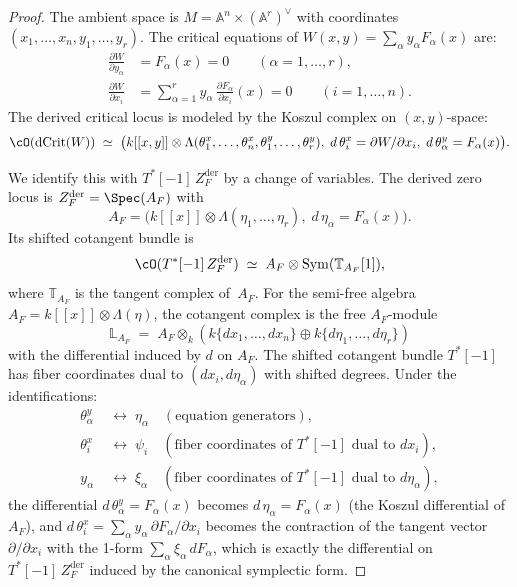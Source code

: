 \begin{proof}
The ambient space is $M = \mathbb{A}^n \times (\mathbb{A}^r)^\vee$ with
coordinates $(x_1, \ldots, x_n, y_1, \ldots, y_r)$.
The critical equations of $W(x,y) = \sum_\alpha y_\alpha F_\alpha(x)$
are:
\begin{align}
\frac{\partial W}{\partial y_\alpha}
&= F_\alpha(x) = 0
\qquad (\alpha = 1, \ldots, r),
\label{eq:dcrit-y-eq} \\
\frac{\partial W}{\partial x_i}
&= \sum_{\alpha=1}^{r} y_\alpha\,
\frac{\partial F_\alpha}{\partial x_i}(x) = 0
\qquad (i = 1, \ldots, n).
\label{eq:dcrit-x-eq}
\end{align}
The derived critical locus is modeled by the Koszul complex on
$(x, y)$-space:
\[
\cO(\operatorname{dCrit}(W))
\;\simeq\;
\bigl(k[[x, y]] \otimes \Lambda(\theta_1^x, \ldots, \theta_n^x,
\theta_1^y, \ldots, \theta_r^y),\;
d\,\theta_i^x = \partial W / \partial x_i,\;
d\,\theta_\alpha^y = F_\alpha(x)\bigr).
\]

We identify this with $T^*[-1]\, Z_F^{\mathrm{der}}$ by a change
of variables. The derived zero locus is
$Z_F^{\mathrm{der}} = \Spec(A_F)$ with
\[
A_F = \bigl(k[[x]] \otimes \Lambda(\eta_1, \ldots, \eta_r),\;
d\,\eta_\alpha = F_\alpha(x)\bigr).
\]
Its shifted cotangent bundle is
\[
\cO(T^*[-1]\, Z_F^{\mathrm{der}})
\;\simeq\;
A_F \otimes \mathrm{Sym}(\mathbb{T}_{A_F}[1]),
\]
where $\mathbb{T}_{A_F}$ is the tangent complex of~$A_F$.
For the semi-free algebra $A_F = k[[x]] \otimes \Lambda(\eta)$,
the cotangent complex is the free $A_F$-module
\[
\mathbb{L}_{A_F}
\;=\; A_F \otimes_k (k\{dx_1, \ldots, dx_n\}
\oplus k\{d\eta_1, \ldots, d\eta_r\})
\]
with the differential induced by $d$ on $A_F$. The shifted
cotangent bundle $T^*[-1]$ has fiber coordinates dual to
$(dx_i, d\eta_\alpha)$ with shifted degrees. Under the
identifications:
\begin{align*}
\theta_\alpha^y &\;\longleftrightarrow\; \eta_\alpha
\quad (\text{equation generators}), \\
\theta_i^x &\;\longleftrightarrow\; \psi_i
\quad (\text{fiber coordinates of } T^*[-1]
\text{ dual to } dx_i), \\
y_\alpha &\;\longleftrightarrow\; \xi_\alpha
\quad (\text{fiber coordinates of } T^*[-1]
\text{ dual to } d\eta_\alpha),
\end{align*}
the differential $d\,\theta_\alpha^y = F_\alpha(x)$ becomes
$d\,\eta_\alpha = F_\alpha(x)$ (the Koszul differential of~$A_F$),
and $d\,\theta_i^x = \sum_\alpha y_\alpha\, \partial F_\alpha /
\partial x_i$ becomes the contraction of the tangent vector
$\partial / \partial x_i$ with the 1-form
$\sum_\alpha \xi_\alpha\, dF_\alpha$, which is exactly the
differential on $T^*[-1]\, Z_F^{\mathrm{der}}$ induced by the
canonical symplectic form.
\end{proof}

